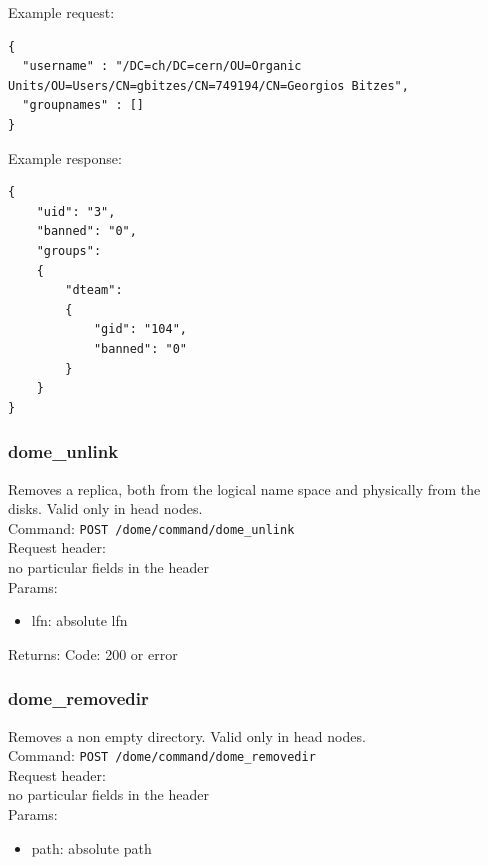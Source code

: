\documentclass[a4paper,10pt]{scrreprt}
\begin{document}
Example request:\\
\begin{lstlisting}
{
  "username" : "/DC=ch/DC=cern/OU=Organic Units/OU=Users/CN=gbitzes/CN=749194/CN=Georgios Bitzes",
  "groupnames" : []
}
\end{lstlisting}

Example response:\\
\begin{lstlisting}
{
    "uid": "3",
    "banned": "0",
    "groups":
    {
        "dteam":
        {
            "gid": "104",
            "banned": "0"
        }
    }
}
\end{lstlisting}


\subsubsection{dome\_unlink}

Removes a replica, both from the logical name space and physically from the disks. Valid only in head nodes.\\
Command:
\lstinline"POST /dome/command/dome_unlink"\\

Request header:\\
no particular fields in the header\\

Params:
\begin{itemize}
 \item lfn: absolute lfn
\end{itemize}

Returns:
Code: 200 or error





\subsubsection{dome\_removedir}

Removes a non empty directory. Valid only in head nodes.\\
Command:
\lstinline"POST /dome/command/dome_removedir"\\

Request header:\\
no particular fields in the header\\

Params:
\begin{itemize}
 \item path: absolute path
\end{itemize}
\end{document}
